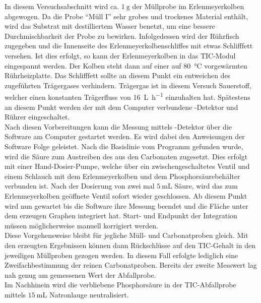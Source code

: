 In diesem Versuchsabschnitt wird ca. $\SI{1}{\gram}$ der Müllprobe im Erlenmeyerkolben abgewogen. Da die Probe "`Müll I"' sehr grobes und trockenes Material enthält, wird das Substrat mit destilliertem Wasser benetzt, um eine bessere Durchmischbarkeit der Probe zu bewirken. Infolgedessen wird der Rührfisch zugegeben und die Innenseite des Erlenmeyerkolbenschliffes mit etwas Schlifffett versehen. Ist dies erfolgt, so kann der Erlenmeyerkolben in das TIC-Modul eingespannt werden. Der Kolben steht dann auf einer auf \SI{80}{\degreeCelsius} vorgewärmten Rührheizplatte. Das Schlifffett sollte an diesem Punkt ein entweichen des zugeführten Trägergases verhindern. Trägergas ist in diesem Versuch Sauerstoff, welcher einen konstanten Trägerfluss von \SI{16}{\liter \per \hour} einzuhalten hat. Spätestens an diesem Punkt werden der mit dem Computer verbundene -Detektor und Rührer eingeschaltet.\\
Nach diesen Vorbereitungen kann die Messung mittels -Detektor über die Software am Computer gestartet werden. Es wird dabei den Anweisungen der Software Folge geleistet. Nach die Basislinie vom Programm gefunden wurde, wird die Säure zum Austreiben des  aus den Carbonaten zugesetzt. Dies erfolgt mit einer Hand-Dosier-Pumpe, welche über ein zwischengeschaltetes Ventil und einem Schlauch mit dem Erlenmeyerkolben und dem Phosphorsäurebehälter verbunden ist. Nach der Dosierung von zwei mal $\SI{5}{\milli \liter}$ Säure, wird das zum Erlenmeyerkolben geöffnete Ventil sofort wieder geschlossen. Ab diesem Punkt wird nun gewartet bis die Software ihre Messung beendet und die Fläche unter dem erzeugen Graphen integriert hat. Start- und Endpunkt der Integration müssen möglicherweise manuell korrigiert werden.\\
Diese Vorgehensweise bleibt für jegliche Müll- und Carbonatproben gleich. Mit den erzeugten Ergebnissen können dann Rückschlüsse auf den TIC-Gehalt in den jeweiligen Müllproben gezogen werden.
In diesem Fall erfolgte lediglich eine Zweifachbestimmung der reinen Carbonatproben. Bereits der zweite Messwert lag nah genug am gemessenen Wert der Abfallprobe.\\ 
Im Nachhinein wird die verbliebene Phosphorsäure in der TIC-Abfallprobe mittels $\SI{15}{\milli \liter}$ Natronlauge neutralisiert.

